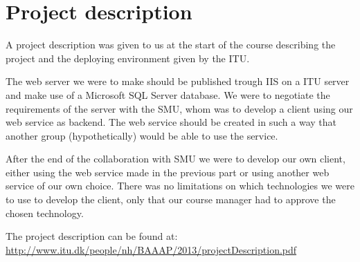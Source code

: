 \section{Project description}
A project description was given to us at the start of the course describing the project and the deploying environment given by the ITU.

The web server we were to make should be published trough IIS on a ITU server and make use of a Microsoft SQL Server database.
We were to negotiate the requirements of the server with the SMU, whom was to develop a client using our web service as backend.
The web service should be created in such a way that another group  (hypothetically) would be able to use the service.

After the end of the collaboration with SMU we were to develop our own client, either using the web service made in the previous part or using another web service of our own choice.
There was no limitations on which technologies we were to use to develop the client, only that our course manager had to approve the chosen technology.

The project description can be found at: \url{http://www.itu.dk/people/nh/BAAAP/2013/projectDescription.pdf}
\newpage